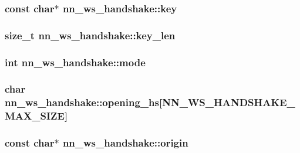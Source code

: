 \subsubsection[{key}]{\setlength{\rightskip}{0pt plus 5cm}const char$\ast$ nn\+\_\+ws\+\_\+handshake\+::key}\hypertarget{structnn__ws__handshake_a813b1dff0fd69dcd24e3fc3d7192c264}{}\label{structnn__ws__handshake_a813b1dff0fd69dcd24e3fc3d7192c264}
\subsubsection[{key\+\_\+len}]{\setlength{\rightskip}{0pt plus 5cm}size\+\_\+t nn\+\_\+ws\+\_\+handshake\+::key\+\_\+len}\hypertarget{structnn__ws__handshake_acb2918c6c1c39d65226c5ba4b7c465c1}{}\label{structnn__ws__handshake_acb2918c6c1c39d65226c5ba4b7c465c1}
\subsubsection[{mode}]{\setlength{\rightskip}{0pt plus 5cm}int nn\+\_\+ws\+\_\+handshake\+::mode}\hypertarget{structnn__ws__handshake_a15288545ca40c9759a9f75bff1c53709}{}\label{structnn__ws__handshake_a15288545ca40c9759a9f75bff1c53709}
\subsubsection[{opening\+\_\+hs}]{\setlength{\rightskip}{0pt plus 5cm}char nn\+\_\+ws\+\_\+handshake\+::opening\+\_\+hs\mbox{[}{\bf N\+N\+\_\+\+W\+S\+\_\+\+H\+A\+N\+D\+S\+H\+A\+K\+E\+\_\+\+M\+A\+X\+\_\+\+S\+I\+ZE}\mbox{]}}\hypertarget{structnn__ws__handshake_a517c18c19321c84f50b5db3bc54df51e}{}\label{structnn__ws__handshake_a517c18c19321c84f50b5db3bc54df51e}
\subsubsection[{origin}]{\setlength{\rightskip}{0pt plus 5cm}const char$\ast$ nn\+\_\+ws\+\_\+handshake\+::origin}\hypertarget{structnn__ws__handshake_a5c331996ce021b6ea02a7b200a5df48d}{}\label{structnn__ws__handshake_a5c331996ce021b6ea02a7b200a5df48d}
